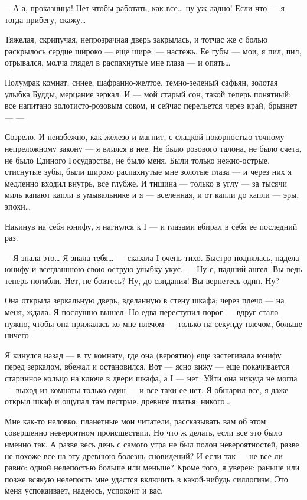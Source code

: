 \documentclass[11pt,openany]{book}
\begin{document}
---А-а, проказница! Нет чтобы работать, как все\ldots{} ну уж ладно! Если что --- я тогда прибегу, скажу\ldots{}

Тяжелая, скрипучая, непрозрачная дверь закрылась, и тотчас же с болью раскрылось сердце широко --- еще шире: --- настежь. Ее губы --- мои, я пил, пил, отрывался, молча глядел в распахнутые мне глаза --- и опять\ldots{}

Полумрак комнат, синее, шафранно-желтое, темно-зеленый сафьян, золотая улыбка Будды, мерцание зеркал. И --- мой старый сон, такой теперь понятный: все напитано золотисто-розовым соком, и сейчас перельется через край, брызнет --- ---

Созрело. И неизбежно, как железо и магнит, с сладкой покорностью точному непреложному закону --- я влился в нее. Не было розового талона, не было счета, не было Единого Государства, не было меня. Были только нежно-острые, стиснутые зубы, были широко распахнутые мне золотые глаза --- и через них я медленно входил внутрь, все глубже. И тишина --- только в углу --- за тысячи миль капают капли в умывальнике и я --- вселенная, и от капли до капли --- эры, эпохи\ldots{}

Накинув на себя юнифу, я нагнулся к I --- и глазами вбирал в себя ее последний раз.

---Я знала это\ldots{} Я знала тебя\ldots{} --- сказала I очень тихо. Быстро поднялась, надела юнифу и всегдашнюю свою острую улыбку-укус. --- Ну-с, падший ангел. Вы ведь теперь погибли. Нет, не боитесь? Ну, до свидания! Вы вернетесь один. Ну?

Она открыла зеркальную дверь, вделанную в стену шкафа; через плечо --- на меня, ждала. Я послушно вышел. Но едва переступил порог --- вдруг стало нужно, чтобы она прижалась ко мне плечом --- только на секунду плечом, больше ничего.

Я кинулся назад --- в ту комнату, где она (вероятно) еще застегивала юнифу перед зеркалом, вбежал и остановился. Вот --- ясно вижу --- еще покачивается старинное кольцо на ключе в двери шкафа, а I --- нет. Уйти она никуда не могла --- выход из комнаты только один --- и все-таки ее нет. Я обшарил все, я даже открыл шкаф и ощупал там пестрые, древние платья: никого\ldots{}

Мне как-то неловко, планетные мои читатели, рассказывать вам об этом совершенно невероятном происшествии. Но что ж делать, если все это было именно так. А разве весь день с самого утра не был полон невероятностей, разве не похоже все на эту древнюю болезнь сновидений? И если так --- не все ли равно: одной нелепостью больше или меньше? Кроме того, я уверен: раньше или позже всякую нелепость мне удастся включить в какой-нибудь силлогизм. Это меня успокаивает, надеюсь, успокоит и вас.
\end{document}
